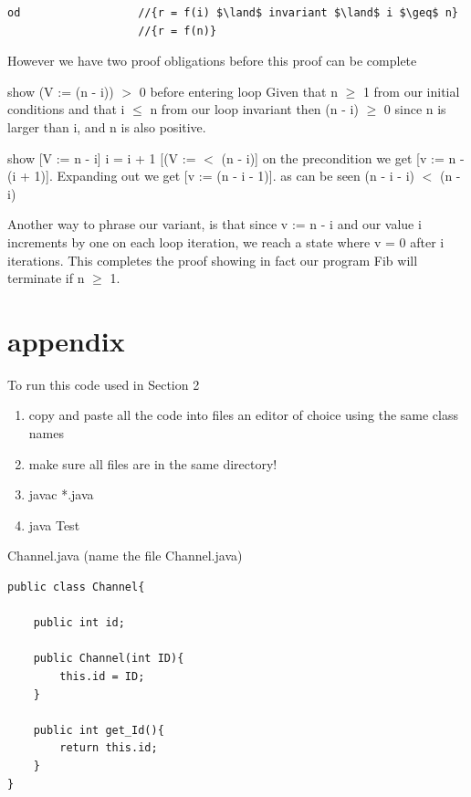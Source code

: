 \documentclass{article}
\begin{document}
\begin{enumerate}[(a)]
\begin{lstlisting}[language=Maple,mathescape=true]
od                  //{r = f(i) $\land$ invariant $\land$ i $\geq$ n}
                    //{r = f(n)}
\end{lstlisting}
However we have two proof obligations before this proof can be complete\\ 
 \begin{list}
        \item {show  (V := (n - i)) $>$ 0 before entering loop}
        Given that n $\geq$ 1 from our initial conditions and that i $\leq$ n from our loop invariant then (n - i) $\geq$ 0 since n is larger than i, and n is also positive.  
    \end{list}
 \begin{list}
        \item {show [V := n - i] i = i + 1 [(V :=  $<$ (n - i)]}
        on the precondition we get [v := n - (i + 1)]. Expanding out we get [v := (n - i - 1)]. as can be seen (n - i - i)  $<$ (n - i)   
    \end{list}
Another way to phrase our variant, is that since v := n - i and our value i increments by one on each loop iteration, we reach a state where v = 0 after i iterations. This completes the proof showing in fact our program Fib will terminate if n $\geq$ 1.
\end{enumerate}

\newpage
\section{appendix}
To run this code used in Section 2 
\begin{enumerate}[1. ]
    \item copy and paste all the code into files an editor of choice using the same class names
    \item make sure all files are in the same directory!
    \item javac *.java
    \item java Test
\end{enumerate}

Channel.java (name the file Channel.java)
\begin{lstlisting}
public class Channel{

    public int id;

    public Channel(int ID){
        this.id = ID;
    }

    public int get_Id(){
        return this.id;
    }
}
\end{lstlisting}
\end{document}
